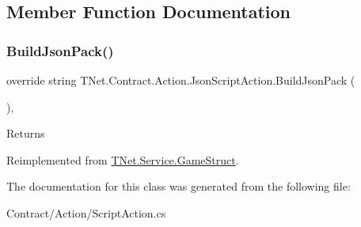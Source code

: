 \subsection{Member Function Documentation}
\mbox{\label{class_t_net_1_1_contract_1_1_action_1_1_json_script_action_a4bad6f9bab878db2b8ddc3a1d24d4b52}} 
\subsubsection{\texorpdfstring{Build\+Json\+Pack()}{BuildJsonPack()}}
{\footnotesize\ttfamily override string T\+Net.\+Contract.\+Action.\+Json\+Script\+Action.\+Build\+Json\+Pack (\begin{DoxyParamCaption}{ }\end{DoxyParamCaption})\hspace{0.3cm}{\ttfamily [protected]}, {\ttfamily [virtual]}}





\begin{DoxyReturn}{Returns}

\end{DoxyReturn}


Reimplemented from \mbox{\hyperlink{class_t_net_1_1_service_1_1_game_struct_a629b46371ae918050fc7c69aee789d92}{T\+Net.\+Service.\+Game\+Struct}}.



The documentation for this class was generated from the following file\+:\begin{DoxyCompactItemize}
\item 
Contract/\+Action/Script\+Action.\+cs\end{DoxyCompactItemize}

